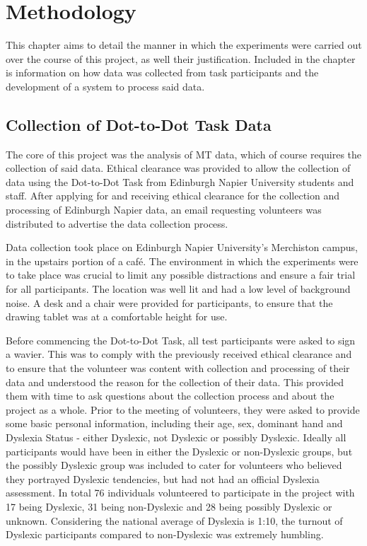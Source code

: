 \section{Methodology}
	This chapter aims to detail the manner in which the experiments were carried out over the course of this project, as well their justification. Included in the chapter is information on how data was collected from task participants and the development of a system to process said data.

	\subsection{Collection of Dot-to-Dot Task Data}
		The core of this project was the analysis of MT data, which of course requires  the collection of said data. Ethical clearance was provided to allow the collection of data using the Dot-to-Dot Task from Edinburgh Napier University students and staff. After applying for and receiving ethical clearance for the collection and processing of Edinburgh Napier data, an email requesting volunteers was distributed to advertise the data collection process.
	
		Data collection took place on Edinburgh Napier University’s Merchiston campus, in the upstairs portion of a café. The environment in which the experiments were to take place was crucial to limit any possible distractions and ensure a fair trial for all participants. The location was well lit and had a low level of background noise. A desk and a chair were provided for participants, to ensure that the drawing tablet was at a comfortable height for use. 
	
		Before commencing the Dot-to-Dot Task, all test participants were asked to sign a wavier. This was to comply with the previously received ethical clearance and to ensure that the volunteer was content with collection and processing of their data and understood the reason for the collection of their data. This provided them with time to ask questions about the collection process and about the project as a whole. Prior to the meeting of volunteers, they were asked to provide some basic personal information, including their age, sex, dominant hand and Dyslexia Status - either Dyslexic, not Dyslexic or possibly Dyslexic. Ideally all participants would have been in either the Dyslexic or non-Dyslexic groups, but the possibly Dyslexic group was included to cater for volunteers who believed they portrayed Dyslexic tendencies, but had not had an official Dyslexia assessment. In total 76 individuals volunteered to participate in the project with 17 being Dyslexic, 31 being non-Dyslexic and 28 being possibly Dyslexic or unknown. Considering the national average of Dyslexia is 1:10, the turnout of Dyslexic participants compared to non-Dyslexic was extremely humbling.
	
